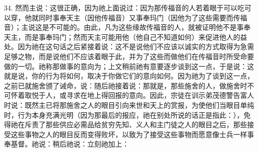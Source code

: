34. 然而主说：这很正确，因为祂上面说过：因为那传福音的人若着眼于可以吃可以穿，他就同时事奉天主（因他传福音）又事奉玛门（因他为了这些需要而传福音）；主说这是不可能的。由此，凡为这些缘故传福音的人，就被证明他不是事奉天主，而是事奉玛门；然而天主可能用他（他自己不知道如何）来促进他人的益处。因为祂在这句话之后紧接着说：这不是说他们不应该以诚实的方式取得为急需足够之物，而是说他们不应该着眼于此，并为了这些而做他们在传福音时所受命要做的一切。祂称那做事的意向为；上文稍前祂有意要逐步谈到这一点，于是说：这就是说，你的行为将如何，取决于你做它们的意向如何。因为祂为了谈到这一点，之前已就施舍颁了诫命，说：随后祂接着说：那就是，那些施舍的人，做施舍时不可怀着取悦于人，或寻求在地上得回报的意向。因此，宗徒在训示弟茂德警告富人时说：既然主已将那施舍之人的眼目引向来世和天上的赏报，为使他们当眼目单纯时，行为本身充满光明（因为那最后的报应，祂在别处所说的话正是指此：），免得祂在斥责了那些供应必需品给贫穷先知、义人和主门徒之人的眼目之后，那些接受这些事物之人的眼目反而变得败坏，以致为了接受这些事物而愿意像士兵一样事奉基督。祂说：稍后祂说：立刻祂加上：\par

